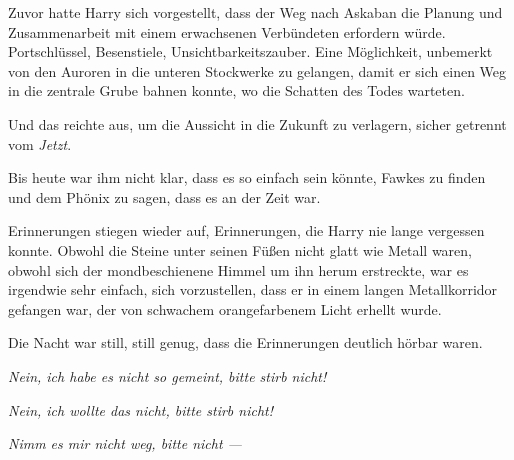Zuvor hatte Harry sich vorgestellt, dass der Weg nach Askaban die Planung und Zusammenarbeit mit einem erwachsenen Verbündeten erfordern würde. Portschlüssel, Besenstiele, Unsichtbarkeitszauber. Eine Möglichkeit, unbemerkt von den Auroren in die unteren Stockwerke zu gelangen, damit er sich einen Weg in die zentrale Grube bahnen konnte, wo die Schatten des Todes warteten.

Und das reichte aus, um die Aussicht in die Zukunft zu verlagern, sicher getrennt vom \emph{Jetzt}.

Bis heute war ihm nicht klar, dass es so einfach sein könnte, Fawkes zu finden und dem Phönix zu sagen, dass es an der Zeit war.

Erinnerungen stiegen wieder auf, Erinnerungen, die Harry nie lange vergessen konnte. Obwohl die Steine unter seinen Füßen nicht glatt wie Metall waren, obwohl sich der mondbeschienene Himmel um ihn herum erstreckte, war es irgendwie sehr einfach, sich vorzustellen, dass er in einem langen Metallkorridor gefangen war, der von schwachem orangefarbenem Licht erhellt wurde.

Die Nacht war still, still genug, dass die Erinnerungen deutlich hörbar waren.

\emph{Nein, ich habe es nicht so gemeint, bitte stirb nicht!}

\emph{Nein, ich wollte das nicht, bitte stirb nicht!}

\emph{Nimm es mir nicht weg, bitte nicht —}

